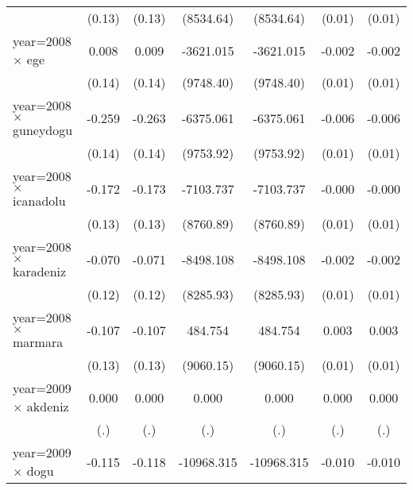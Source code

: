 {\begin{tabular}{l*{6}{c}}
                    &      (0.13)         &      (0.13)         &   (8534.64)         &   (8534.64)         &      (0.01)         &      (0.01)         \\
year=2008 $\times$ ege&       0.008         &       0.009         &   -3621.015         &   -3621.015         &      -0.002         &      -0.002         \\
                    &      (0.14)         &      (0.14)         &   (9748.40)         &   (9748.40)         &      (0.01)         &      (0.01)         \\
year=2008 $\times$ guneydogu&      -0.259         &      -0.263         &   -6375.061         &   -6375.061         &      -0.006         &      -0.006         \\
                    &      (0.14)         &      (0.14)         &   (9753.92)         &   (9753.92)         &      (0.01)         &      (0.01)         \\
year=2008 $\times$ icanadolu&      -0.172         &      -0.173         &   -7103.737         &   -7103.737         &      -0.000         &      -0.000         \\
                    &      (0.13)         &      (0.13)         &   (8760.89)         &   (8760.89)         &      (0.01)         &      (0.01)         \\
year=2008 $\times$ karadeniz&      -0.070         &      -0.071         &   -8498.108         &   -8498.108         &      -0.002         &      -0.002         \\
                    &      (0.12)         &      (0.12)         &   (8285.93)         &   (8285.93)         &      (0.01)         &      (0.01)         \\
year=2008 $\times$ marmara&      -0.107         &      -0.107         &     484.754         &     484.754         &       0.003         &       0.003         \\
                    &      (0.13)         &      (0.13)         &   (9060.15)         &   (9060.15)         &      (0.01)         &      (0.01)         \\
year=2009 $\times$ akdeniz&       0.000         &       0.000         &       0.000         &       0.000         &       0.000         &       0.000         \\
                    &         (.)         &         (.)         &         (.)         &         (.)         &         (.)         &         (.)         \\
year=2009 $\times$ dogu&      -0.115         &      -0.118         &  -10968.315         &  -10968.315         &      -0.010         &      -0.010         \\

\end{tabular}}

